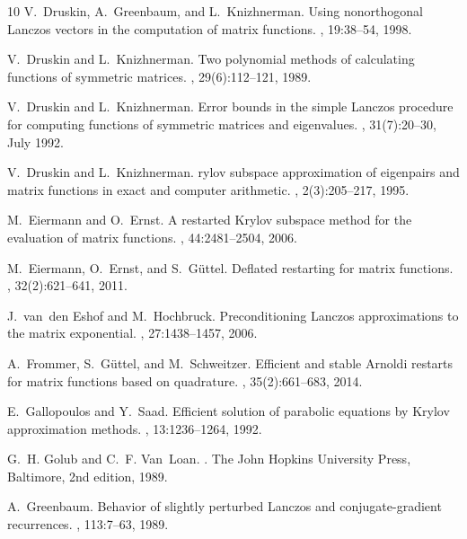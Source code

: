 \documentclass[smallextended]{svjour3pre}%
\numberwithin{equation}{section}
\numberwithin{figure}{section}
\numberwithin{table}{section}
\begin{document}
\begin{thebibliography}{10}
V.~Druskin, A.~Greenbaum, and L.~Knizhnerman.
\newblock Using nonorthogonal {L}anczos vectors in the computation of matrix
  functions.
, 19:38--54, 1998.

V.~Druskin and L.~Knizhnerman.
\newblock Two polynomial methods of calculating functions of symmetric
  matrices.
, 29(6):112--121, 1989.

V.~Druskin and L.~Knizhnerman.
\newblock Error bounds in the simple {L}anczos procedure for computing
  functions of symmetric matrices and eigenvalues.
, 31(7):20--30, July 1992.

V.~Druskin and L.~Knizhnerman.
rylov subspace approximation of eigenpairs and matrix functions in
  exact and computer arithmetic.
, 2(3):205--217, 1995.

M.~Eiermann and O.~Ernst.
\newblock A restarted {K}rylov subspace method for the evaluation of matrix
  functions.
, 44:2481--2504, 2006.

M.~Eiermann, O.~Ernst, and S.~G{\"u}ttel.
\newblock Deflated restarting for matrix functions.
, 32(2):621--641, 2011.

J.~van~den Eshof and M.~Hochbruck.
\newblock Preconditioning {L}anczos approximations to the matrix exponential.
, 27:1438--1457, 2006.

A.~Frommer, S.~G{\"u}ttel, and M.~Schweitzer.
\newblock Efficient and stable {A}rnoldi restarts for matrix functions based on
  quadrature.
, 35(2):661--683, 2014.

E.~Gallopoulos and Y.~Saad.
\newblock Efficient solution of parabolic equations by {K}rylov approximation
  methods.
, 13:1236--1264, 1992.

G.~H. Golub and C.~F. Van~Loan.
.
\newblock The John Hopkins University Press, Baltimore, 2nd edition, 1989.

A.~Greenbaum.
\newblock Behavior of slightly perturbed {L}anczos and conjugate-gradient
  recurrences.
, 113:7--63, 1989.


\end{thebibliography}
\end{document}
